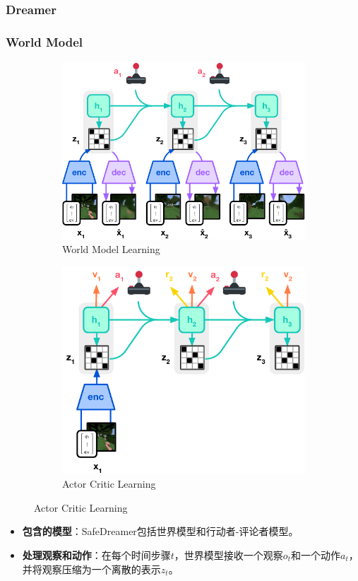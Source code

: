 \documentclass[10pt,mathserif]{beamer}%
\begin{document}
\subsubsection{Dreamer}
\begin{frame}[t, fragile]
  \frametitle{World Model}
   \begin{figure}
\begin{subfigure}{.5\textwidth}
\includegraphics[width=0.75\linewidth]{images/model_wm.pdf}
\caption{World Model Learning}
\end{subfigure}
\begin{subfigure}{.43\textwidth}
\includegraphics[width=0.75\linewidth]{images/model_ac.pdf}
\caption{Actor Critic Learning}
\end{subfigure}
\label{fig:model}
\end{figure}
{
\fontsize{8pt}{9.6pt}\selectfont
\begin{itemize}
\item \textbf{包含的模型}：SafeDreamer包括世界模型和行动者-评论者模型。
\item \textbf{处理观察和动作}：在每个时间步骤$t$，世界模型接收一个观察$o_t$和一个动作$a_t$，并将观察压缩为一个离散的表示$z_t$。

\end{itemize}}
\end{frame}
\end{document}
